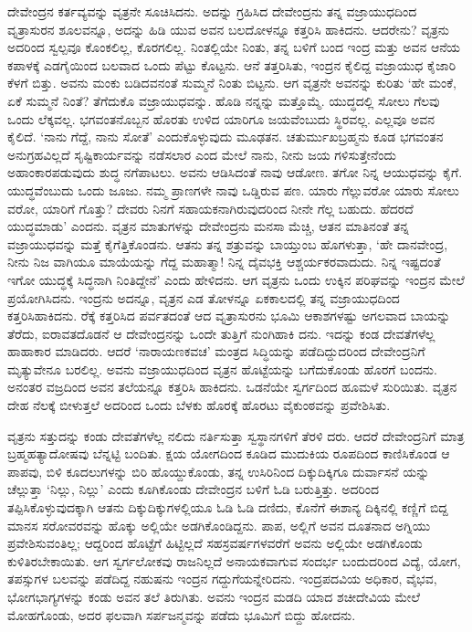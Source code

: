 ದೇವೇಂದ್ರನ ಕರ್ತವ್ಯವನ್ನು ವೃತ್ರನೇ ಸೂಚಿಸಿದನು. ಅದನ್ನು ಗ್ರಹಿಸಿದ ದೇವೇಂದ್ರನು ತನ್ನ ವಜ್ರಾಯುಧದಿಂದ ವೃತ್ರಾಸುರನ ಶೂಲವನ್ನೂ, ಅದನ್ನು ಹಿಡಿ ಯುವ ಅವನ ಬಲದೋಳನ್ನೂ ಕತ್ತರಿಸಿ ಹಾಕಿದನು. ಆದರೇನು? ವೃತ್ರನು ಅದರಿಂದ ಸ್ವಲ್ಪವೂ ಕೊಂಕಲಿಲ್ಲ, ಕೊರಗಲಿಲ್ಲ. ನಿಂತಲ್ಲಿಯೇ ನಿಂತು, ತನ್ನ ಬಳಿಗೆ ಬಂದ ಇಂದ್ರ ಮತ್ತು ಅವನ ಆನೆಯ ಕಪಾಳಕ್ಕೆ ಎಡಗೈಯಿಂದ ಬಲವಾದ ಒಂದು ಪೆಟ್ಟು ಕೊಟ್ಟನು. ಆನೆ ತತ್ತರಿಸಿತು, ಇಂದ್ರನ ಕೈಲಿದ್ದ ವಜ್ರಾಯುಧ ಕೈಜಾರಿ ಕೆಳಗೆ ಬಿತ್ತು. ಅವನು ಮಂಕು ಬಡಿದವನಂತೆ ಸುಮ್ಮನೆ ನಿಂತು ಬಿಟ್ಟನು. ಆಗ ವೃತ್ರನೇ ಅವನನ್ನು ಕುರಿತು ‘ಹೇ ಮಂಕೆ, ಏಕೆ ಸುಮ್ಮನೆ ನಿಂತೆ? ತೆಗೆದುಕೊ ವಜ್ರಾಯುಧವನ್ನು. ಹೊಡಿ ನನ್ನನ್ನು ಮತ್ತೊಮ್ಮೆ. ಯುದ್ಧದಲ್ಲಿ ಸೋಲು ಗೆಲವು ಒಂದು ಲೆಕ್ಕವಲ್ಲ. ಭಗವಂತನೊಬ್ಬನ ಹೊರತು ಉಳಿದ ಯಾರಿಗೂ ಜಯವೆಂಬುದು ಸ್ಥಿರವಲ್ಲ. ಎಲ್ಲವೂ ಅವನ ಕೈಲಿದೆ. ‘ನಾನು ಗೆದ್ದೆ, ನಾನು ಸೋತೆ’ ಎಂದುಕೊಳ್ಳುವುದು ಮೂಢತನ. ಚತುರ್ಮುಖಬ್ರಹ್ಮನು ಕೂಡ ಭಗವಂತನ ಅನುಗ್ರಹವಿಲ್ಲದೆ ಸೃಷ್ಟಿಕಾರ್ಯವನ್ನು ನಡೆಸಲಾರ ಎಂದ ಮೇಲೆ ನಾನು, ನೀನು ಜಯ ಗಳಿಸುತ್ತೇನೆಂದು ಅಹಾಂಕಾರಪಡುವುದು ಶುದ್ಧ ನಗೆಪಾಟಲು. ಅವನು ಆಡಿಸಿದಂತೆ ನಾವು ಆಡೋಣ. ತಗೋ ನಿನ್ನ ಆಯುಧವನ್ನು ಕೈಗೆ. ಯುದ್ಧವೆಂಬುದು ಒಂದು ಜೂಜು. ನಮ್ಮ ಪ್ರಾಣಗಳೇ ನಾವು ಒಡ್ಡಿರುವ ಪಣ. ಯಾರು ಗೆಲ್ಲುವರೋ ಯಾರು ಸೋಲು ವರೋ, ಯಾರಿಗೆ ಗೊತ್ತು? ದೇವರು ನಿನಗೆ ಸಹಾಯಕನಾಗಿರುವುದರಿಂದ ನೀನೇ ಗೆಲ್ಲ ಬಹುದು. ಹೆದರದೆ ಯುದ್ಧಮಾಡು’ ಎಂದನು. ವೃತ್ರನ ಮಾತುಗಳನ್ನು ದೇವೇಂದ್ರನು ಮನಸಾ ಮೆಚ್ಚಿ, ಆತನ ಮಾತಿನಂತೆ ತನ್ನ ವಜ್ರಾಯುಧವನ್ನು ಮತ್ತೆ ಕೈಗೆತ್ತಿಕೊಂಡನು. ಆತನು ತನ್ನ ಶತ್ರುವನ್ನು ಬಾಯ್ತುಂಬ ಹೊಗಳುತ್ತಾ, ‘ಹೇ ದಾನವೇಂದ್ರ, ನೀನು ನಿಜ ವಾಗಿಯೂ ಮಾಯೆಯನ್ನು ಗೆದ್ದ ಮಹಾತ್ಮಾ! ನಿನ್ನ ದೈವಭಕ್ತಿ ಆಶ್ಚರ್ಯಕರವಾದುದು. ನಿನ್ನ ಇಷ್ಟದಂತೆ ಇಗೋ ಯುದ್ಧಕ್ಕೆ ಸಿದ್ಧನಾಗಿ ನಿಂತಿದ್ದೇನೆ’ ಎಂದು ಹೇಳಿದನು. ಆಗ ವೃತ್ರನು ಒಂದು ಉಕ್ಕಿನ ಪರಿಘವನ್ನು ಇಂದ್ರನ ಮೇಲೆ ಪ್ರಯೋಗಿಸಿದನು. ಇಂದ್ರನು ಅದನ್ನೂ, ವೃತ್ರನ ಎಡ ತೋಳನ್ನೂ ಏಕಕಾಲದಲ್ಲಿ ತನ್ನ ವಜ್ರಾಯುಧದಿಂದ ಕತ್ತರಿಸಿಹಾಕಿದನು. ರೆಕ್ಕೆ ಕತ್ತರಿಸಿದ ಪರ್ವತದಂತೆ ಆದ ವೃತ್ರಾಸುರನು ಭೂಮಿ ಆಕಾಶಗಳಷ್ಟು ಅಗಲವಾದ ಬಾಯನ್ನು ತೆರೆದು, ಐರಾವತದೊಡನೆ ಆ ದೇವೇಂದ್ರನನ್ನು ಒಂದೇ ತುತ್ತಿಗೆ ನುಂಗಿಹಾಕಿ ದನು. ಇದನ್ನು ಕಂಡ ದೇವತೆಗಳೆಲ್ಲ ಹಾಹಾಕಾರ ಮಾಡಿದರು. ಆದರೆ ‘ನಾರಾಯಣಕವಚ’ ಮಂತ್ರದ ಸಿದ್ಧಿಯನ್ನು ಪಡೆದಿದ್ದುದರಿಂದ ದೇವೇಂದ್ರನಿಗೆ ಮೃತ್ಯುವೇನೂ ಬರಲಿಲ್ಲ. ಅವನು ವಜ್ರಾಯುಧದಿಂದ ವೃತ್ರನ ಹೊಟ್ಟೆಯನ್ನು ಬಗೆದುಕೊಂಡು ಹೊರಗೆ ಬಂದನು. ಅನಂತರ ವಜ್ರದಿಂದ ಅವನ ತಲೆಯನ್ನೂ ಕತ್ತರಿಸಿ ಹಾಕಿದನು. ಒಡನೆಯೇ ಸ್ವರ್ಗದಿಂದ ಹೂಮಳೆ ಸುರಿಯಿತು. ವೃತ್ರನ ದೇಹ ನೆಲಕ್ಕೆ ಬೀಳುತ್ತಲೆ ಅದರಿಂದ ಒಂದು ಬೆಳಕು ಹೊರಕ್ಕೆ ಹೊರಟು ವೈಕುಂಠವನ್ನು ಪ್ರವೇಶಿಸಿತು.

ವೃತ್ರನು ಸತ್ತುದನ್ನು ಕಂಡು ದೇವತೆಗಳೆಲ್ಲ ನಲಿದು ನರ್ತಿಸುತ್ತಾ ಸ್ವಸ್ಥಾನಗಳಿಗೆ ತೆರಳಿ ದರು. ಆದರೆ ದೇವೇಂದ್ರನಿಗೆ ಮಾತ್ರ ಬ್ರಹ್ಮಹತ್ಯಾದೋಷವು ಬೆನ್ನಟ್ಟಿ ಬಂದಿತು. ಕ್ಷಯ ಯೋಗದಿಂದ ಕೂಡಿದ ಮುದುಕಿಯ ರೂಪದಿಂದ ಕಾಣಿಸಿಕೊಂಡ ಆ ಪಾಪವು, ಬಿಳಿ ಕೂದಲುಗಳನ್ನು ಬಿರಿ ಹೊಯ್ದುಕೊಂಡು, ತನ್ನ ಉಸಿರಿನಿಂದ ದಿಕ್ಕುದಿಕ್ಕಿಗೂ ದುರ್ವಾಸನೆ ಯನ್ನು ಚೆಲ್ಲುತ್ತಾ ‘ನಿಲ್ಲು, ನಿಲ್ಲು’ ಎಂದು ಕೂಗಿಕೊಂಡು ದೇವೇಂದ್ರನ ಬಳಿಗೆ ಓಡಿ ಬರುತ್ತಿತ್ತು. ಅದರಿಂದ ತಪ್ಪಿಸಿಕೊಳ್ಳುವುದಕ್ಕಾಗಿ ಆತನು ದಿಕ್ಕುದಿಕ್ಕುಗಳಲ್ಲಿಯೂ ಓಡಿ ಓಡಿ ದಣಿದು, ಕೊನೆಗೆ ಈಶಾನ್ಯ ದಿಕ್ಕಿನಲ್ಲಿ ಕಣ್ಣಿಗೆ ಬಿದ್ದ ಮಾನಸ ಸರೋವರವನ್ನು ಹೊಕ್ಕು ಅಲ್ಲಿಯೇ ಅಡಗಿಕೊಂಡಿದ್ದನು. ಪಾಪ, ಅಲ್ಲಿಗೆ ಅವನ ದೂತನಾದ ಅಗ್ನಿಯು ಪ್ರವೇಶಿಸುವಂತಿಲ್ಲ; ಆದ್ದರಿಂದ ಹೊಟ್ಟೆಗೆ ಹಿಟ್ಟಿಲ್ಲದೆ ಸಹಸ್ರವರ್ಷಗಳವರೆಗೆ ಅವನು ಅಲ್ಲಿಯೇ ಅಡಗಿಕೊಂಡು ಕುಳಿತಿರಬೇಕಾಯಿತು. ಆಗ ಸ್ವರ್ಗಲೋಕವು ರಾಜನಿಲ್ಲದೆ ಅನಾಯಕವಾಗುವ ಸಂದರ್ಭ ಬಂದುದರಿಂದ ವಿದ್ಯೆ, ಯೋಗ, ತಪಸ್ಸುಗಳ ಬಲವನ್ನು ಪಡೆದಿದ್ದ ನಹುಷನು ಇಂದ್ರನ ಗದ್ದುಗೆಯನ್ನೇರಿದನು. ಇಂದ್ರಪದವಿಯ ಅಧಿಕಾರ, ವೈಭವ, ಭೋಗಭಾಗ್ಯಗಳನ್ನು ಕಂಡು ಅವನ ತಲೆ ತಿರುಗಿತು. ಅವನು ಇಂದ್ರನ ಮಡದಿ ಯಾದ ಶಚೀದೇವಿಯ ಮೇಲೆ ಮೋಹಗೊಂಡು, ಅದರ ಫಲವಾಗಿ ಸರ್ಪಜನ್ಮವನ್ನು ಪಡೆದು ಭೂಮಿಗೆ ಬಿದ್ದು ಹೋದನು.

